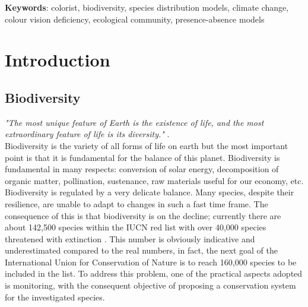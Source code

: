 \documentclass[12pt,a4paper]{article}
\begin{document}
 
\vspace{1cm}
\textbf{Keywords}: colorist, biodiversity, species distribution models, climate change, colour vision deficiency, ecological community, presence-absence models
\\

\section{Introduction}
\subsection{Biodiversity}
\textit{"The most unique feature of Earth is the existence of life, and the most extraordinary feature of life is its diversity."} \citep{cardinale}.\\
Biodiversity is the variety of all forms of life on earth but the most important point is that it is fundamental for the balance of this planet.
Biodiversity is fundamental in many respects: conversion of solar energy, decomposition of organic matter, pollination, sustenance, raw materials useful for our economy, etc.
Biodiversity is regulated by a very delicate balance.
Many species, despite their resilience, are unable to adapt to changes in such a fast time frame.
The consequence of this is that biodiversity is on the decline; currently there are about 142,500 species within the IUCN red list with over 40,000 species threatened with extinction \citep{IUCN}. This number is obviously indicative and underestimated compared to the real numbers, in fact, the next goal of the International Union for Conservation of Nature is to reach 160,000 species to be included in the list.
To address this problem, one of the practical aspects adopted is monitoring, with the consequent objective of proposing a conservation system for the investigated species.
\end{document}
